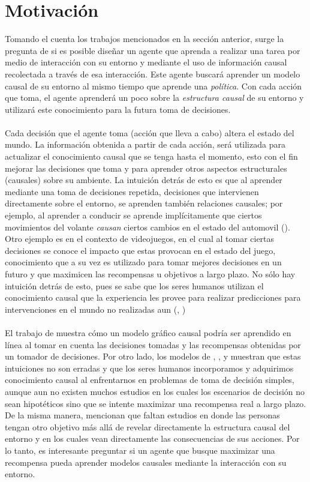 \documentclass[11pt]{article}
\theoremstyle{plain}
\begin{document}
\section{Motivación}
Tomando el cuenta los trabajos mencionados en la sección anterior, surge la pregunta de si es posible diseñar un agente que aprenda a realizar una tarea por medio de interacción con su entorno y mediante el uso de información causal recolectada a través de esa interacción. Este agente buscará aprender un modelo causal de su entorno al mismo tiempo que aprende una \textit{política}. Con cada acción que toma, el agente aprenderá  un poco sobre la \textit{estructura causal} de su entorno y utilizará este conocimiento para la futura toma de decisiones.\\
\\
Cada decisión que el agente toma (acción que lleva a cabo) altera el estado del mundo. La información obtenida a partir de cada acción, será utilizada para actualizar el conocimiento causal que se tenga hasta el momento, esto con el fin mejorar las decisiones que toma y para aprender otros aspectos estructurales (causales) sobre su ambiente. La intuición detrás de esto es que al aprender mediante una toma de decisiones repetida, decisiones que intervienen directamente sobre el entorno, se aprenden también relaciones causales; por ejemplo, al aprender a conducir se aprende implícitamente que ciertos movimientos del volante \textit{causan} ciertos cambios en el estado del automovil (\cite{danks2014unifying}). Otro ejemplo es en el contexto de videojuegos, en el cual al tomar ciertas decisiones se conoce el impacto que estas provocan en el estado del juego, conocimiento que a su vez es utilizado para tomar mejores decisiones en un futuro y que maximicen las recompensas u objetivos a largo plazo. No sólo hay intuición detrás de esto, pues se sabe que los seres humanos utilizan el conocimiento causal que la experiencia les provee para realizar predicciones para intervenciones en el mundo no realizadas aun (\cite{meder2008inferring}, \cite{hagmayer2009decision})\\
\\
El trabajo de \cite{wellen2012learning} muestra cómo un modelo gráfico causal podría ser aprendido en línea al tomar en cuenta las decisiones tomadas y las recompensas obtenidas por un tomador de decisiones. Por otro lado, los modelos de \cite{sloman2006causal}, \cite{meder2008inferring}, \cite{hagmayer2009decision} y \cite{hagmayer2013repeated} muestran que estas intuiciones no son erradas y que los seres humanos incorporamos y adquirimos conocimiento causal al enfrentarnos en problemas de toma de decisión simples, aunque aun no existen muchos estudios en los cuales los escenarios de decisión no sean hipotéticos sino que se intente maximizar una recompensa real a largo plazo. De la misma manera, \cite{hagmayer2013repeated} mencionan que faltan estudios en donde las personas tengan otro objetivo más allá de revelar directamente la estructura causal del entorno y en los cuales vean directamente las consecuencias de sus acciones. Por lo tanto, es interesante preguntar si un agente que busque maximizar una recompensa pueda aprender modelos causales mediante la interacción con su entorno.
\end{document}
